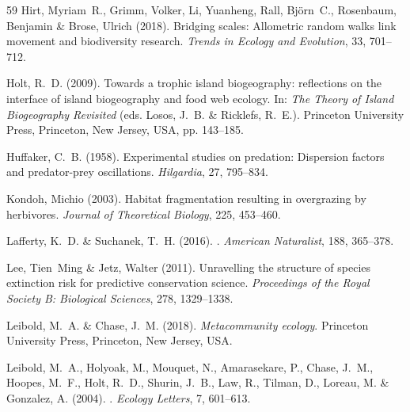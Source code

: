 \documentclass[11pt]{article}
\begin{document}
\begin{thebibliography}{59}
Hirt, Myriam~R., Grimm, Volker, Li, Yuanheng, Rall, Björn~C., Rosenbaum,
  Benjamin \& Brose, Ulrich (2018).
\newblock Bridging scales: Allometric random walks link movement and
  biodiversity research.
\newblock \emph{Trends in Ecology and Evolution}, 33, 701--712.

Holt, R.~D. (2009).
\newblock Towards a trophic island biogeography: reflections on the interface
  of island biogeography and food web ecology.
\newblock In: \emph{The Theory of Island Biogeography Revisited} (eds. Losos,
  J.~B. \& Ricklefs, R.~E.).
\newblock Princeton University Press, Princeton, New Jersey, USA, pp. 143--185.

Huffaker, C.~B. (1958).
\newblock Experimental studies on predation: Dispersion factors and
  predator-prey oscillations.
\newblock \emph{Hilgardia}, 27, 795--834.

Kondoh, Michio (2003).
\newblock Habitat fragmentation resulting in overgrazing by herbivores.
\newblock \emph{Journal of Theoretical Biology}, 225, 453--460.

Lafferty, K.~D. \& Suchanek, T.~H. (2016).
.
\newblock \emph{American Naturalist}, 188, 365--378.

Lee, Tien~Ming \& Jetz, Walter (2011).
\newblock Unravelling the structure of species extinction risk for predictive
  conservation science.
\newblock \emph{Proceedings of the Royal Society B: Biological Sciences}, 278,
  1329--1338.

Leibold, M.~A. \& Chase, J.~M. (2018).
\newblock \emph{Metacommunity ecology}.
\newblock Princeton University Press, Princeton, New Jersey, USA.

Leibold, M.~A., Holyoak, M., Mouquet, N., Amarasekare, P., Chase, J.~M.,
  Hoopes, M.~F., Holt, R.~D., Shurin, J.~B., Law, R., Tilman, D., Loreau, M. \&
  Gonzalez, A. (2004).
.
\newblock \emph{Ecology Letters}, 7, 601--613.


\end{thebibliography}
\end{document}
